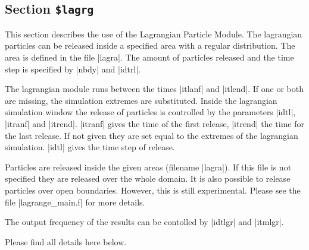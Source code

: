 \subsection{Section {\tt \$lagrg}}


This section describes the use of the Lagrangian Particle Module.
The lagrangian particles can be released inside a specified area with a
regular distribution. The area is defined in the file |lagra|.
The amount of particles released and the
time step is specified by |nbdy| and |idtrl|.

The lagrangian module runs between the times |itlanf| and |itlend|. If one
or both are missing, the simulation extremes are substituted. Inside
the lagrangian simulation window the release of particles is controlled
by the parameters |idtl|, |itranf| and |itrend|. |itranf| gives the time
of the first release, |itrend| the time for the last release. If not
given they are set equal to the extremes of the lagrangian simulation.
|idtl| gives the time step of release.

Particles are released inside the given areas (filename |lagra|). If
this file is not specified they are released over the whole domain. It is also possible to
 release particles over open boundaries. However,
this is still experimental. Please see the file |lagrange_main.f|
for more details.

The output frequency of the results can be contolled by
|idtlgr| and |itmlgr|.

Please find all details here below.

\par

\par

\par


